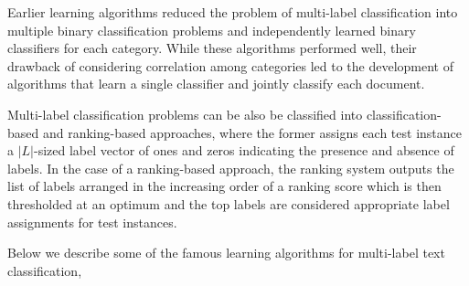 Earlier learning algorithms reduced the problem of multi-label classification into multiple binary classification problems and independently learned binary classifiers for each category. While these algorithms performed well, their drawback of considering correlation among categories led to the development of algorithms that learn a single classifier and jointly classify each document. 

Multi-label classification problems can be also be classified into classification-based and ranking-based approaches, where the former assigns each test instance a $|L|$-sized label vector of ones and zeros indicating the presence and absence of labels. In the case of a ranking-based approach, the ranking system outputs the list of labels arranged in the increasing order of a ranking score which is then thresholded at an optimum and the top labels are considered appropriate label assignments for test instances.

Below we describe some of the famous learning algorithms for multi-label text classification, 

